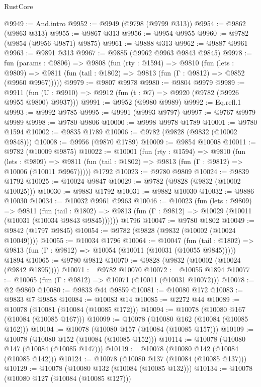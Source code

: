 \begin{lexlean}{RustCore}
\begin{coremodule}
@9949 := And.intro
@9952 := @9949 (@9798 (@9799 @313))
@9954 := @9862 (@9863 @313)
@9955 := @9867 @313
@9956 := @9954 @9955
@9960 := @9782 (@9854 (@9956 @9871) @9875)
@9961 := @9888 @313
@9962 := @9887 @9961
@9963 := @9891 @313
@9967 := @9885 (@9962 @9963 @9843 @9845)
@9978 := fun (params : @9806) =>
  @9808
    (fun (rty : @1594) =>
    @9810
      (fun (lets : @9809) =>
      @9811 (fun (tail : @1802) => @9813 (fun (Γ : @9812) => @9852 (@9960 @9967)))))
@9979 := @9807 @9978
@9980 := @9804 @9979
@9989 := @9911 (fun (U : @9910) => @9912 (fun (t : @7) => @9920 (@9782 (@9926 @9955 @9800) @9937)))
@9991 := @9952 (@9980 @9989)
@9992 := Eq.refl.{1}
@9993 := @9992 @9785
@9995 := @9991 (@9993 @9797)
@9997 := @9767 @9979 @9989
@9998 := @9780 @9806
@10000 := @9998 @9978 @1789
@10001 := @9780 @1594
@10002 := @9835 @1789
@10006 := @9782 (@9828 (@9832 (@10002 @9848)))
@10008 := @9956 (@9870 @1789)
@10009 := @9854 @10008
@10011 := @9782 (@10009 @9875)
@10022 := @10001
    (fun (rty : @1594) =>
    @9810
      (fun (lets : @9809) =>
      @9811 (fun (tail : @1802) => @9813 (fun (Γ : @9812) => @10006 (@10011 @9967)))))
    @1792
@10023 := @9780 @9809
@10024 := @9839 @1792
@10025 := @10024 @9847
@10029 := @9782 (@9828 (@9832 (@10002 @10025)))
@10030 := @9883 @1792
@10031 := @9882 @10030
@10032 := @9886 @10030
@10034 := @10032 @9961 @9963
@10046 := @10023
    (fun (lets : @9809) =>
    @9811
      (fun (tail : @1802) =>
      @9813 (fun (Γ : @9812) => @10029 (@10011 (@10031 (@10034 @9843 @9845))))))
    @1796
@10047 := @9780 @1802
@10049 := @9842 (@1797 @9845)
@10054 := @9782 (@9828 (@9832 (@10002 (@10024 @10049))))
@10055 := @10034 @1796
@10064 := @10047
    (fun (tail : @1802) => @9813 (fun (Γ : @9812) => @10054 (@10011 (@10031 (@10055 @9845)))))
    @1894
@10065 := @9780 @9812
@10070 := @9828 (@9832 (@10002 (@10024 (@9842 @1895))))
@10071 := @9782 @10070
@10072 := @10055 @1894
@10077 := @10065 (fun (Γ : @9812) => @10071 (@10011 (@10031 @10072)))
@10078 := @2 @9860
@10080 := @9833 @44 @9859
@10081 := @10080 @172
@10083 := @9833 @7 @9858
@10084 := @10083 @14
@10085 := @2272 @44
@10089 := @10078 (@10081 (@10084 (@10085 @172)))
@10094 := @10078 (@10080 @167 (@10084 (@10085 @167)))
@10099 := @10078 (@10080 @162 (@10084 (@10085 @162)))
@10104 := @10078 (@10080 @157 (@10084 (@10085 @157)))
@10109 := @10078 (@10080 @152 (@10084 (@10085 @152)))
@10114 := @10078 (@10080 @147 (@10084 (@10085 @147)))
@10119 := @10078 (@10080 @142 (@10084 (@10085 @142)))
@10124 := @10078 (@10080 @137 (@10084 (@10085 @137)))
@10129 := @10078 (@10080 @132 (@10084 (@10085 @132)))
@10134 := @10078 (@10080 @127 (@10084 (@10085 @127)))

\end{coremodule}
\end{lexlean}
